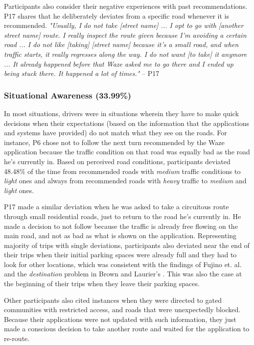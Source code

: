 Participants also consider their negative experiences with past recommendations. P17 shares that he deliberately deviates from a specific road whenever it is recommended. \emph{"Usually, I do not take [street name] ... I opt to go with [another street name] route. I really inspect the route given because I'm avoiding a certain road ... I do not like [taking] [street name] because it's a small road, and when traffic starts, it really regresses along the way. I do not want [to take] it anymore ... It already happened before that Waze asked me to go there and I ended up being stuck there. It happened a lot of times."}  -- P17

\subsubsection{Situational Awareness (33.99\%)}
In most situations, drivers were in situations wherein they have to make quick decisions when their expectations (based on the information that the applications and systems have provided) do not match what they see on the roads. For instance, P6 chose not to follow the next turn recommended by the Waze application because the traffic condition on that road was equally bad as the road he's currently in. Based on perceived road conditions, participants deviated 48.48\% of the time from recommended roads with \emph{medium} traffic conditions to \emph{light} ones and always from recommended roads with \emph{heavy} traffic to \emph{medium} and \emph{light} ones. 

P17 made a similar deviation when he was asked to take a circuitous route through small residential roads, just to return to the road he's currently in. He made a decision to not follow because the traffic is already free flowing on the main road, and not as bad as what is shown on the application. Representing majority of trips with single deviations, participants also deviated near the end of their trips when their initial parking spaces were already full and they had to look for other locations, which was consistent with the findings of Fujino et. al. \cite{Fujino2018DetectingTracks} and the \emph{destination} problem in Brown and Laurier's \cite{Brown2012TheGPS}. This was also the case at the beginning of their trips when they leave their parking spaces.  

Other participants also cited instances when they were directed to gated communities with restricted access, and roads that were unexpectedly blocked. Because their applications were not updated with such information, they just made a conscious decision to take another route and waited for the application to re-route. 

